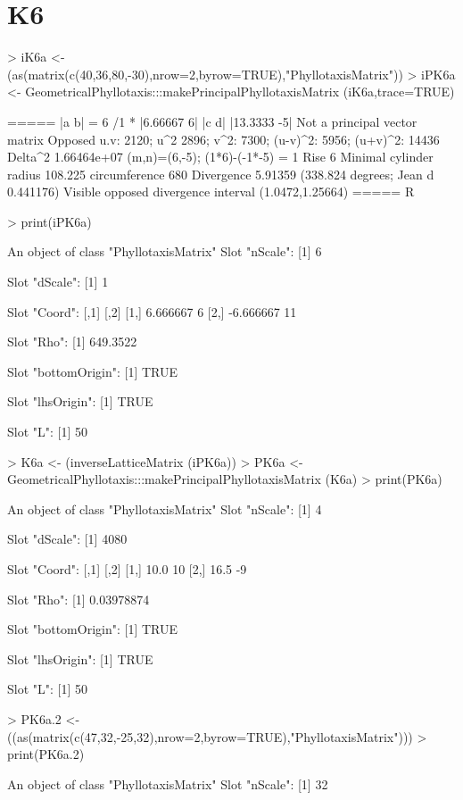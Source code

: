 \documentclass[a4paper]{article}
\begin{document}
\section{K6}
\begin{Schunk}
\begin{Sinput}
> iK6a <- (as(matrix(c(40,36,80,-30),nrow=2,byrow=TRUE),"PhyllotaxisMatrix"))
> iPK6a <- GeometricalPhyllotaxis:::makePrincipalPhyllotaxisMatrix (iK6a,trace=TRUE)
\end{Sinput}
\begin{Soutput}
=====
|a	b|  = 6  /1   *  |6.66667	  6|
|c	d|               |13.3333	 -5|
Not a principal vector matrix
Opposed
u.v: 2120; u^2 2896; v^2: 7300; (u-v)^2: 5956; (u+v)^2: 14436
Delta^2 1.66464e+07 
(m,n)=(6,-5); (1*6)-(-1*-5) = 1
Rise 6
Minimal cylinder radius 108.225 circumference 680 
Divergence 5.91359 (338.824 degrees; Jean d 0.441176)
Visible opposed divergence interval (1.0472,1.25664)
=====
R
\end{Soutput}
\begin{Sinput}
> print(iPK6a)
\end{Sinput}
\begin{Soutput}
An object of class "PhyllotaxisMatrix"
Slot "nScale":
[1] 6

Slot "dScale":
[1] 1

Slot "Coord":
          [,1] [,2]
[1,]  6.666667    6
[2,] -6.666667   11

Slot "Rho":
[1] 649.3522

Slot "bottomOrigin":
[1] TRUE

Slot "lhsOrigin":
[1] TRUE

Slot "L":
[1] 50
\end{Soutput}
\begin{Sinput}
> K6a <- (inverseLatticeMatrix (iPK6a))
> PK6a <- GeometricalPhyllotaxis:::makePrincipalPhyllotaxisMatrix (K6a)
> print(PK6a)
\end{Sinput}
\begin{Soutput}
An object of class "PhyllotaxisMatrix"
Slot "nScale":
[1] 4

Slot "dScale":
[1] 4080

Slot "Coord":
     [,1] [,2]
[1,] 10.0   10
[2,] 16.5   -9

Slot "Rho":
[1] 0.03978874

Slot "bottomOrigin":
[1] TRUE

Slot "lhsOrigin":
[1] TRUE

Slot "L":
[1] 50
\end{Soutput}
\begin{Sinput}
> PK6a.2 <- ((as(matrix(c(47,32,-25,32),nrow=2,byrow=TRUE),"PhyllotaxisMatrix")))
> print(PK6a.2)
\end{Sinput}
\begin{Soutput}
An object of class "PhyllotaxisMatrix"
Slot "nScale":
[1] 32


\end{Soutput}
\end{Schunk}
\end{document}
